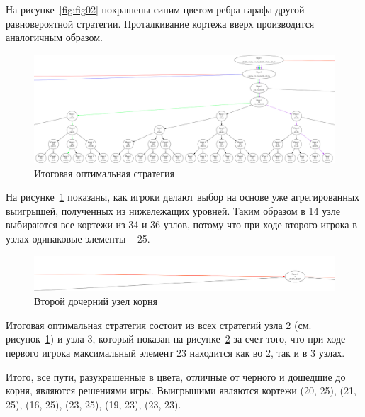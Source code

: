 На рисунке~\ref{fig:fig02} покрашены синим цветом ребра гарафа другой равновероятной
стратегии. Проталкивание кортежа вверх производится аналогичным образом.

\begin{figure}
  \centering
  \includegraphics[scale=0.3]{../../artifacts/lw4/3.png}
  \caption{Итоговая оптимальная стратегия}
  \label{fig:fig03}
\end{figure}

На рисунке~\ref{fig:fig03} показаны, как игроки делают выбор на основе уже агрегированных
выигрышей, полученных из нижележащих уровней. Таким образом в 14 узле выбираются все
кортежи из 34 и 36 узлов, потому что при ходе второго игрока в узлах одинаковые элементы
-- 25.

\begin{figure}
  \centering
  \includegraphics[scale=0.3]{../../artifacts/lw4/4.png}
  \caption{Второй дочерний узел корня}
  \label{fig:fig04}
\end{figure}

Итоговая оптимальная стратегия состоит из всех стратегий узла 2 (см.
рисунок~\ref{fig:fig03}) и узла 3, который показан на рисунке~\ref{fig:fig04} за счет
того, что при ходе первого игрока максимальный элемент 23 находится как во 2, так и в 3
узлах.

Итого, все пути, разукрашенные в цвета, отличные от черного и дошедшие до корня,
являются решениями игры. Выигрышими являются кортежи (20, 25), (21, 25), (16, 25),
(23, 25), (19, 23), (23, 23).
